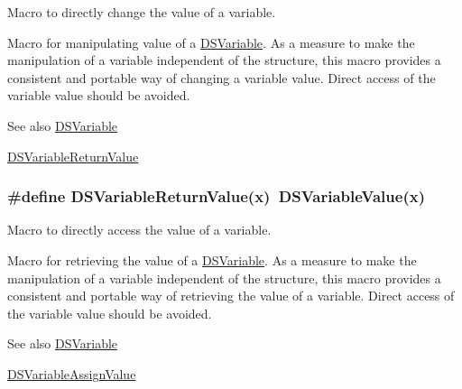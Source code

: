 Macro to directly change the value of a variable. 

Macro for manipulating value of a \hyperlink{struct_d_s_variable}{DSVariable}. As a measure to make the manipulation of a variable independent of the structure, this macro provides a consistent and portable way of changing a variable value. Direct access of the variable value should be avoided.

\begin{DoxySeeAlso}{See also}
\hyperlink{struct_d_s_variable}{DSVariable} 

\hyperlink{group___d_s___v_a_r_i_a_b_l_e___a_c_c_e_s_s_o_r_y_ga912df8d84202953a573824aebcf2498f}{DSVariableReturnValue} 
\end{DoxySeeAlso}
\hypertarget{group___d_s___v_a_r_i_a_b_l_e___a_c_c_e_s_s_o_r_y_ga912df8d84202953a573824aebcf2498f}{
\subsubsection[{DSVariableReturnValue}]{\setlength{\rightskip}{0pt plus 5cm}\#define DSVariableReturnValue(x)~DSVariableValue(x)}}
\label{group___d_s___v_a_r_i_a_b_l_e___a_c_c_e_s_s_o_r_y_ga912df8d84202953a573824aebcf2498f}


Macro to directly access the value of a variable. 

Macro for retrieving the value of a \hyperlink{struct_d_s_variable}{DSVariable}. As a measure to make the manipulation of a variable independent of the structure, this macro provides a consistent and portable way of retrieving the value of a variable. Direct access of the variable value should be avoided. \begin{DoxySeeAlso}{See also}
\hyperlink{struct_d_s_variable}{DSVariable} 

\hyperlink{group___d_s___v_a_r_i_a_b_l_e___a_c_c_e_s_s_o_r_y_ga3e1730e26b5f44a34e64d7996233d023}{DSVariableAssignValue} 
\end{DoxySeeAlso}
